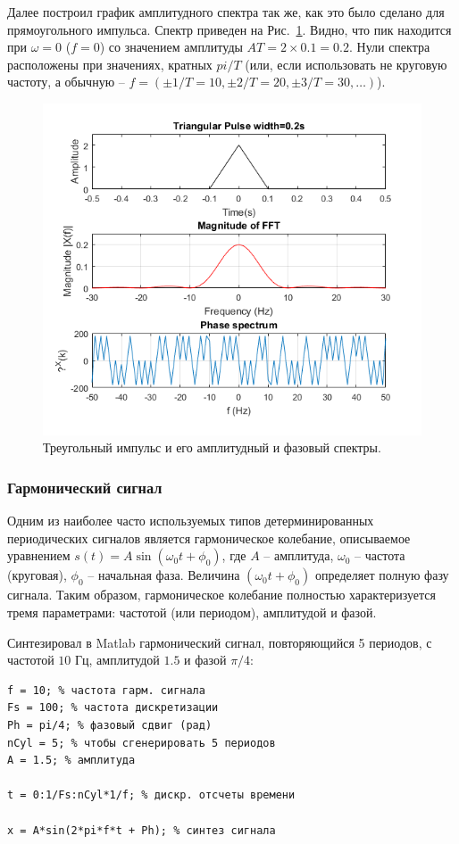 \documentclass[12pt,a4paper]{article}
\begin{document}
Далее построил график амплитудного спектра так же, как это было сделано для прямоугольного импульса. Спектр приведен на Рис.~\ref{img:sp_tri_pulse}. Видно, что пик находится при $\omega=0$ ($f=0$) со значением амплитуды $AT=2\times 0.1=0.2$. Нули спектра расположены при значениях, кратных $pi/T$ (или, если использовать не круговую частоту, а обычную -- $f=(\pm 1/T=10, \pm 2/T=20, \pm 3/T=30,\ldots)$).
\begin{figure}[H]
\includegraphics[width=\linewidth]{sp_tri_pulse}
\caption{Треугольный импульс и его амплитудный и фазовый спектры.}
\label{img:sp_tri_pulse}
\end{figure}

\subsubsection{Гармонический сигнал}


Одним из наиболее часто используемых типов детерминированных периодических сигналов является гармоническое колебание, описываемое уравнением $s\left(t\right)=A\sin\left(\omega_0t+\phi_0\right)$, где $A$ -- амплитуда, $\omega_0$ -- частота (круговая), $\phi_0$ -- начальная фаза. Величина $\left(\omega_0 t+\phi_0\right)$ определяет полную фазу сигнала. Таким образом, гармоническое колебание полностью характеризуется тремя параметрами: частотой (или периодом), амплитудой и фазой.

Синтезировал в Matlab гармонический сигнал, повторяющийся 5 периодов, с частотой $10$ Гц, амплитудой $1.5$ и фазой $\pi/4$:
\begin{verbatim}
f = 10; % частота гарм. сигнала
Fs = 100; % частота дискретизации
Ph = pi/4; % фазовый сдвиг (рад)
nCyl = 5; % чтобы сгенерировать 5 периодов
A = 1.5; % амплитуда
 
t = 0:1/Fs:nCyl*1/f; % дискр. отсчеты времени

x = A*sin(2*pi*f*t + Ph); % синтез сигнала
\end{verbatim}
\end{document}
